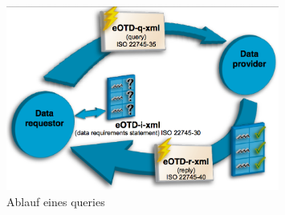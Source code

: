 \begin{figure}[htbp]
	\centering
		\includegraphics[width=0.8\textwidth]{images/ig_query_response.png}
	\caption{Ablauf eines queries}
	\label{fig:ig_query_response}
\end{figure}
